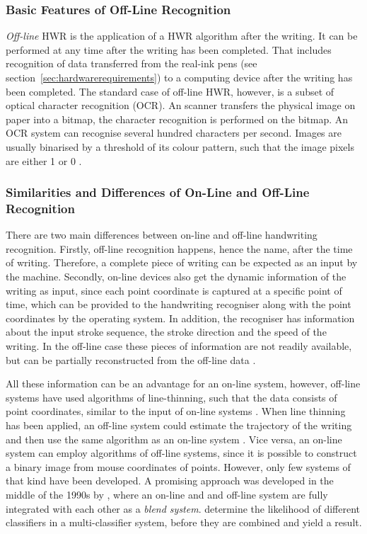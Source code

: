 \subsubsection{Basic Features of Off-Line Recognition}
\label{sec:basicfeaturesofofflinerecognition}

\emph{Off-line} HWR is the application of a HWR algorithm after the writing.
It can be performed at any time after the writing has been completed. That 
includes recognition of data transferred from the real-ink pens 
(see section~\ref{sec:hardwarerequirements}) to a computing device after the 
writing has been completed. The standard case of off-line HWR, however, is a 
subset of optical character recognition (OCR). An scanner transfers the physical 
image on paper into a bitmap, the character recognition is performed on the 
bitmap.
An OCR system can recognise several hundred characters per second. Images are
usually binarised by a threshold of its colour pattern, such that the image
pixels are either 1 or 0 .

\subsubsection[Similarities and Differences]{Similarities and Differences of On-Line and Off-Line  Recognition}
\label{sec:similaritiesanddifferences}

There are two main differences between on-line and off-line handwriting
recognition. Firstly, off-line recognition happens, hence the name, 
after the time of writing. Therefore, a complete piece of writing can be 
expected as an input by the machine. Secondly, on-line devices also get the
dynamic information of the writing as input, since each point coordinate 
is captured at a specific point of time, which can be provided to the 
handwriting recogniser along with the point coordinates by the operating system.
In addition, the recogniser has information about the input stroke sequence, 
the stroke direction and the speed of the writing. In the off-line case these 
pieces of information are not readily available, but can be partially 
reconstructed from the off-line data .

All these information can be an advantage for an on-line system, however, 
off-line systems have used algorithms of line-thinning, such that the data 
consists of point coordinates, similar to the input of on-line systems 
. When line thinning has been applied, an off-line 
system could estimate the trajectory of the writing and then use the same 
algorithm as an on-line system . 
Vice versa, an on-line system can employ algorithms of off-line systems, 
since it is possible to construct a binary image from mouse coordinates 
of points. However, only few systems of that kind have been developed. 
A promising approach was developed in the middle of the 1990s by 
, where an on-line and and off-line system are 
fully integrated with each other as a \emph{blend system}.
 determine the likelihood of different classifiers in
a multi-classifier system, before they are combined and yield a result.

